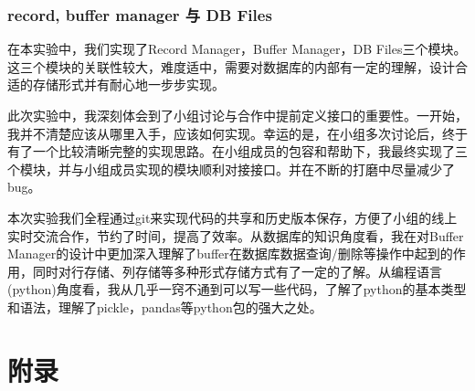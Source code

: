 \documentclass[UTF8]{ctexrep} %
\begin{document}
\section{record, buffer manager 与 DB Files}
在本实验中，我们实现了Record Manager，Buffer Manager，DB Files三个模块。这三个模块的关联性较大，难度适中，需要对数据库的内部有一定的理解，设计合适的存储形式并有耐心地一步步实现。
\par
此次实验中，我深刻体会到了小组讨论与合作中提前定义接口的重要性。一开始，我并不清楚应该从哪里入手，应该如何实现。幸运的是，在小组多次讨论后，终于有了一个比较清晰完整的实现思路。在小组成员的包容和帮助下，我最终实现了三个模块，并与小组成员实现的模块顺利对接接口。并在不断的打磨中尽量减少了bug。
\par
本次实验我们全程通过git来实现代码的共享和历史版本保存，方便了小组的线上实时交流合作，节约了时间，提高了效率。从数据库的知识角度看，我在对Buffer Manager的设计中更加深入理解了buffer在数据库数据查询/删除等操作中起到的作用，同时对行存储、列存储等多种形式存储方式有了一定的了解。从编程语言(python)角度看，我从几乎一窍不通到可以写一些代码，了解了python的基本类型和语法，理解了pickle，pandas等python包的强大之处。

\newpage
\part{附录}
\end{document}
